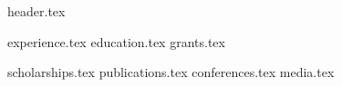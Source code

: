 \documentclass[a4paper,11pt]{article}
\author{Kathryn Caruso}
\begin{document}
{header.tex}
\vspace*{10pt}

{experience.tex}
{education.tex}
{grants.tex}

\pagebreak

{scholarships.tex}
{publications.tex}
{conferences.tex}
{media.tex}
\end{document}

